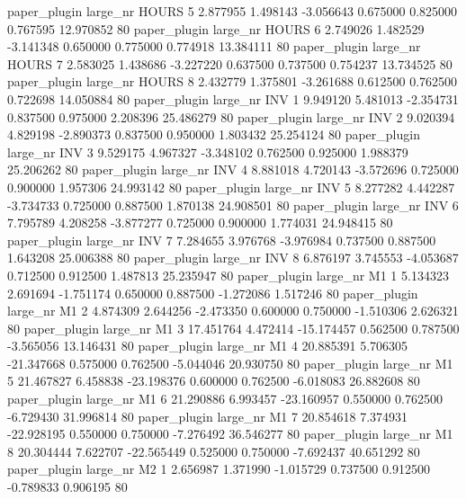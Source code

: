 paper_plugin   large_nr    HOURS                 5  2.877955  1.498143  -3.056643 0.675000 0.825000  0.767595   12.970852 80
paper_plugin   large_nr    HOURS                 6  2.749026  1.482529  -3.141348 0.650000 0.775000  0.774918   13.384111 80
paper_plugin   large_nr    HOURS                 7  2.583025  1.438686  -3.227220 0.637500 0.737500  0.754237   13.734525 80
paper_plugin   large_nr    HOURS                 8  2.432779  1.375801  -3.261688 0.612500 0.762500  0.722698   14.050884 80
paper_plugin   large_nr      INV                 1  9.949120  5.481013  -2.354731 0.837500 0.975000  2.208396   25.486279 80
paper_plugin   large_nr      INV                 2  9.020394  4.829198  -2.890373 0.837500 0.950000  1.803432   25.254124 80
paper_plugin   large_nr      INV                 3  9.529175  4.967327  -3.348102 0.762500 0.925000  1.988379   25.206262 80
paper_plugin   large_nr      INV                 4  8.881018  4.720143  -3.572696 0.725000 0.900000  1.957306   24.993142 80
paper_plugin   large_nr      INV                 5  8.277282  4.442287  -3.734733 0.725000 0.887500  1.870138   24.908501 80
paper_plugin   large_nr      INV                 6  7.795789  4.208258  -3.877277 0.725000 0.900000  1.774031   24.948415 80
paper_plugin   large_nr      INV                 7  7.284655  3.976768  -3.976984 0.737500 0.887500  1.643208   25.006388 80
paper_plugin   large_nr      INV                 8  6.876197  3.745553  -4.053687 0.712500 0.912500  1.487813   25.235947 80
paper_plugin   large_nr       M1                 1  5.134323  2.691694  -1.751174 0.650000 0.887500 -1.272086    1.517246 80
paper_plugin   large_nr       M1                 2  4.874309  2.644256  -2.473350 0.600000 0.750000 -1.510306    2.626321 80
paper_plugin   large_nr       M1                 3 17.451764  4.472414 -15.174457 0.562500 0.787500 -3.565056   13.146431 80
paper_plugin   large_nr       M1                 4 20.885391  5.706305 -21.347668 0.575000 0.762500 -5.044046   20.930750 80
paper_plugin   large_nr       M1                 5 21.467827  6.458838 -23.198376 0.600000 0.762500 -6.018083   26.882608 80
paper_plugin   large_nr       M1                 6 21.290886  6.993457 -23.160957 0.550000 0.762500 -6.729430   31.996814 80
paper_plugin   large_nr       M1                 7 20.854618  7.374931 -22.928195 0.550000 0.750000 -7.276492   36.546277 80
paper_plugin   large_nr       M1                 8 20.304444  7.622707 -22.565449 0.525000 0.750000 -7.692437   40.651292 80
paper_plugin   large_nr       M2                 1  2.656987  1.371990  -1.015729 0.737500 0.912500 -0.789833    0.906195 80
